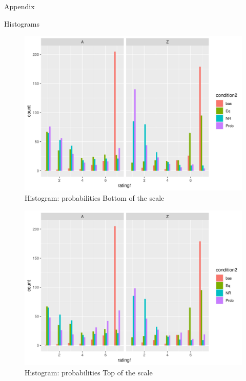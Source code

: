 \documentclass[
  ignorenonframetext,
]{beamer}
\begin{document}
\begin{frame}{Appendix}
\protect\hypertarget{appendix}{}
\begin{block}{Histograms}
\protect\hypertarget{histograms}{}
\begin{figure}
\centering
\includegraphics{"histogram_faceted_prob_bott.png"}
\caption{Histogram: probabilities Bottom of the scale}
\end{figure}
\end{block}
\end{frame}

\begin{frame}
\begin{figure}
\centering
\includegraphics{"histogram_faceted_prob_top.png"}
\caption{Histogram: probabilities Top of the scale}
\end{figure}
\end{frame}
\end{document}
